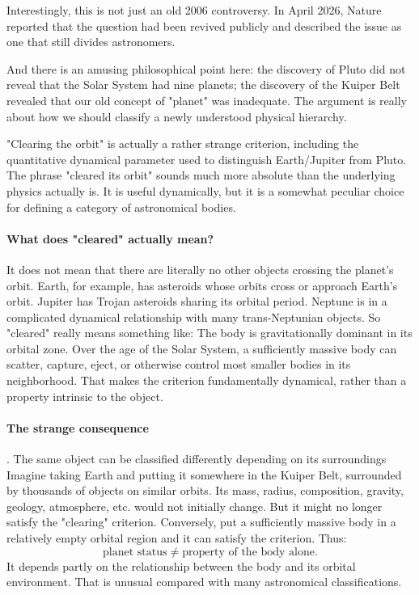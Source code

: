 Interestingly, this is not just an old 2006 controversy. In April 2026, Nature reported that the question had been revived publicly and described the issue as one that still divides astronomers.

And there is an amusing philosophical point here: the discovery of Pluto did not reveal that the Solar System had nine planets; the discovery of the Kuiper Belt revealed that our old concept of "planet" was inadequate. The argument is really about how we should classify a newly understood physical hierarchy.

"Clearing the orbit" is actually a rather strange criterion, 
including the quantitative dynamical parameter used to distinguish Earth/Jupiter from Pluto.
The phrase "cleared its orbit" sounds much more absolute than the underlying physics actually is. It is useful dynamically, but it is a somewhat peculiar choice for defining a category of astronomical bodies.

\paragraph{What does "cleared" actually mean?}
It does not mean that there are literally no other objects crossing the planet's orbit.
Earth, for example, has asteroids whose orbits cross or approach Earth's orbit. Jupiter has Trojan asteroids sharing its orbital period. Neptune is in a complicated dynamical relationship with many trans-Neptunian objects.
So "cleared" really means something like:
The body is gravitationally dominant in its orbital zone.
Over the age of the Solar System, a sufficiently massive body can scatter, capture, eject, or otherwise control most smaller bodies in its neighborhood.
That makes the criterion fundamentally dynamical, rather than a property intrinsic to the object.

\paragraph{The strange consequence}. The same object can be classified differently depending on its surroundings
Imagine taking Earth and putting it somewhere in the Kuiper Belt, surrounded by thousands of objects on similar orbits.
Its mass, radius, composition, gravity, geology, atmosphere, etc. would not initially change.
But it might no longer satisfy the "clearing" criterion.
Conversely, put a sufficiently massive body in a relatively empty orbital region and it can satisfy the criterion.
Thus:
$$ \text{planet status} \neq \text{property of the body alone}. $$
It depends partly on the relationship between the body and its orbital environment.
That is unusual compared with many astronomical classifications.

